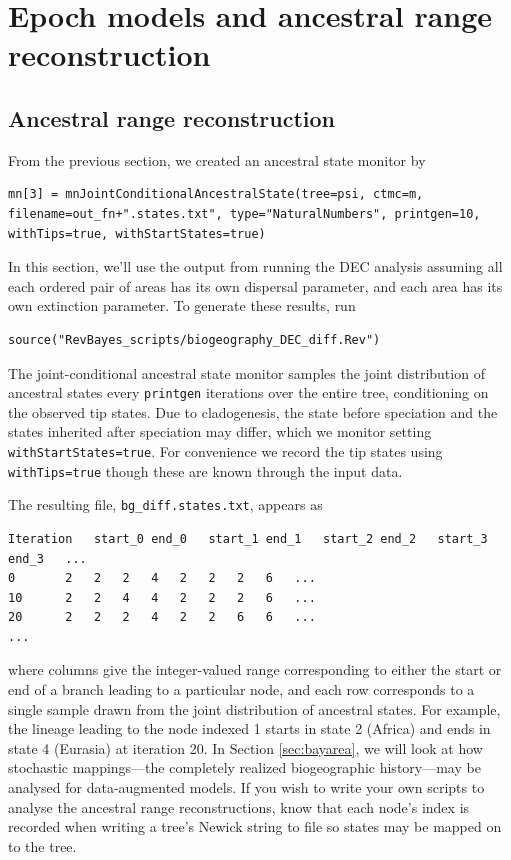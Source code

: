 \section{Epoch models and ancestral range reconstruction}

\subsection{Ancestral range reconstruction}


From the previous section, we created an ancestral state monitor by
\begin{snugshade}
\begin{lstlisting}
mn[3] = mnJointConditionalAncestralState(tree=psi, ctmc=m, filename=out_fn+".states.txt", type="NaturalNumbers", printgen=10, withTips=true, withStartStates=true)
\end{lstlisting}
\end{snugshade}

In this section, we'll use the output from running the DEC analysis assuming all each ordered pair of areas has its own dispersal parameter, and each area has its own extinction parameter.
To generate these results, run
\begin{snugshade}
\begin{lstlisting}
source("RevBayes_scripts/biogeography_DEC_diff.Rev")
\end{lstlisting}
\end{snugshade}


The joint-conditional ancestral state monitor samples the joint distribution of ancestral states every {\tt printgen} iterations over the entire tree, conditioning on the observed tip states.
Due to cladogenesis, the state before speciation and the states inherited after speciation may differ, which we monitor setting {\tt withStartStates=true}.
For convenience we record the tip states using {\tt withTips=true} though these are known through the input data.

The resulting file, {\tt bg\_diff.states.txt}, appears as

\begin{framed}
\begin{lstlisting}
Iteration	start_0	end_0	start_1	end_1	start_2	end_2	start_3	end_3	...
0		2	2	2	4	2	2	2	6	...
10		2	2	4	4	2	2	2	6	...
20		2	2	2	4	2	2	6	6	...
...
\end{lstlisting}
\end{framed}

where columns give the integer-valued range corresponding to either the start or end of a branch leading to a particular node, and each row corresponds to a single sample drawn from the joint distribution of ancestral states.
For example, the lineage leading to the node indexed 1 starts in state 2 (Africa) and ends in state 4 (Eurasia) at iteration 20.
In Section \ref{sec:bayarea}, we will look at how stochastic mappings---the completely realized biogeographic history---may be analysed for data-augmented models.
If you wish to write your own scripts to analyse the ancestral range reconstructions, know that each node's index is recorded when writing a tree's Newick string to file so states may be mapped on to the tree.

